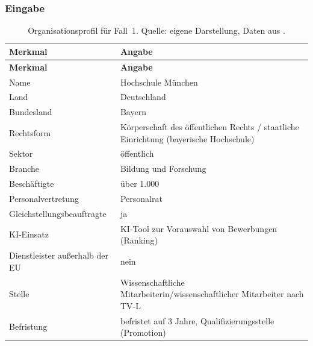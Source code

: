 
\subsubsection{Eingabe}
\begin{small}
\begin{longtable}{@{}>{\raggedright\arraybackslash}p{5.0cm}>{\raggedright\arraybackslash}p{9.5cm}@{}}
\caption[Organisationsprofil für Fall~1]{Organisationsprofil für Fall~1. Quelle: eigene Darstellung, Daten aus .}\label{tab:h1_profil}\\
\toprule \textbf{Merkmal} & \textbf{Angabe} \\ \midrule \endfirsthead
\toprule \textbf{Merkmal} & \textbf{Angabe} \\ \midrule \endhead
\bottomrule \endfoot
Name & Hochschule München \\
Land & Deutschland \\
Bundesland & Bayern \\
Rechtsform & Körperschaft des öffentlichen Rechts / staatliche Einrichtung (bayerische Hochschule) \\
Sektor & öffentlich \\
Branche & Bildung und Forschung \\
Beschäftigte & über 1.000 \\
Personalvertretung & Personalrat \\
Gleichstellungsbeauftragte & ja \\
KI-Einsatz & KI-Tool zur Vorauswahl von Bewerbungen (Ranking) \\
Dienstleister außerhalb der EU & nein \\
Stelle & Wissenschaftliche Mitarbeiterin/wissenschaftlicher Mitarbeiter nach TV-L \\
Befristung & befristet auf 3 Jahre, Qualifizierungsstelle (Promotion) \\
\end{longtable}
\end{small}

